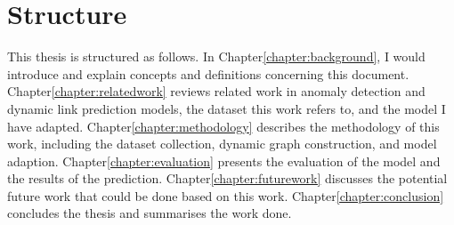 \section{Structure}

This thesis is structured as follows. In Chapter\ref{chapter:background}, I would introduce and explain concepts and definitions concerning this document. Chapter\ref{chapter:relatedwork} reviews related work in anomaly detection and dynamic link prediction models, the dataset this work refers to, and the model I have adapted. Chapter\ref{chapter:methodology} describes the methodology of this work, including the dataset collection, dynamic graph construction, and model adaption. Chapter\ref{chapter:evaluation} presents the evaluation of the model and the results of the prediction. Chapter\ref{chapter:futurework} discusses the potential future work that could be done based on this work. Chapter\ref{chapter:conclusion} concludes the thesis and summarises the work done.





